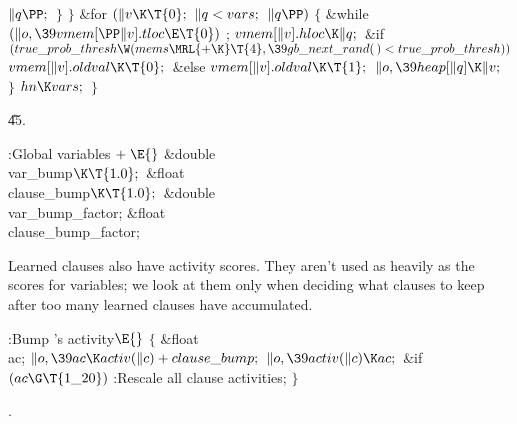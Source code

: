 ${}\|q\PP;{}$\6
\4${}\}{}$\2\6
\4${}\}{}$\2\6
\&{for} ${}(\|v\K\T{0};{}$ ${}\|q<\\{vars};{}$ ${}\|q\PP){}$\5
${}\{{}$\1\6
\&{while} ${}(\|o,\39\\{vmem}[\PP\|v].\\{tloc}\E\T{0}){}$\1\5
;\2\6
${}\\{vmem}[\|v].\\{hloc}\K\|q;{}$\6
\&{if} ${}(\\{true\_prob\_thresh}\W(\\{mems}\MRL{+{\K}}\T{4},\39\\{gb\_next%
\_rand}(\,)<\\{true\_prob\_thresh})){}$\1\5
${}\\{vmem}[\|v].\\{oldval}\K\T{0};{}$\2\6
\&{else}\1\5
${}\\{vmem}[\|v].\\{oldval}\K\T{1};{}$\2\6
${}\|o,\39\\{heap}[\|q]\K\|v;{}$\6
\4${}\}{}$\2\6
${}\\{hn}\K\\{vars};{}$\6
\4${}\}{}$\2\par
\U45.\fi

\B{}:Global variables\X${}\mathrel+\E{}$\6
\&{double} \\{var\_bump}${}\K\T{1.0};{}$\6
\&{float} \\{clause\_bump}${}\K\T{1.0};{}$\6
\&{double} \\{var\_bump\_factor};\6
\&{float} \\{clause\_bump\_factor};\par
\fi

Learned clauses also have activity scores. They aren't used as
heavily as the scores for variables; we look at them only when
deciding what clauses to keep after too many learned clauses
have accumulated.

\Y\B\4:Bump 's activity\X${}\E{}$\6
${}\{{}$\1\6
\&{float} \\{ac};\7
${}\|o,\39\\{ac}\K\\{activ}(\|c)+\\{clause\_bump};{}$\6
${}\|o,\39\\{activ}(\|c)\K\\{ac};{}$\6
\&{if} ${}(\\{ac}\G\T{1\_20}){}$\1\5
:Rescale all clause activities\X;\2\6
\4${}\}{}$\2\par
{}.\fi

